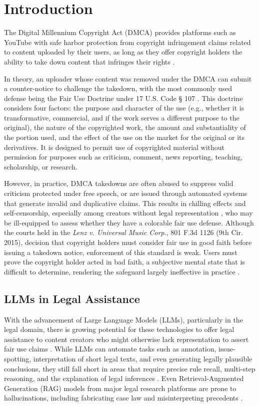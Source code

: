 \section{Introduction}

The Digital Millennium Copyright Act (DMCA) provides platforms such as YouTube with safe harbor protection from copyright infringement claims related to content uploaded by their users, as long as they offer copyright holders the ability to take down content that infringes their rights \cite{16_DMCA}.

In theory, an uploader whose content was removed under the DMCA can submit a counter-notice to challenge the takedown, with the most commonly used defense being the Fair Use Doctrine under 17 U.S. Code § 107 \cite{15_USC107}. This doctrine considers four factors: the purpose and character of the use (e.g., whether it is transformative, commercial, and if the work serves a different purpose to the original), the nature of the copyrighted work, the amount and substantiality of the portion used, and the effect of the use on the market for the original or its derivatives. It is designed to permit use of copyrighted material without permission for purposes such as criticism, comment, news reporting, teaching, scholarship, or research.

However, in practice, DMCA takedowns are often abused to suppress valid criticism protected under free speech, or are issued through automated systems that generate invalid and duplicative claims. This results in chilling effects and self-censorship, especially among creators without legal representation , who may be ill-equipped to assess whether they have a colorable fair use defense. Although the courts held in the \textit{Lenz v. Universal Music Corp.}, 801 F.3d 1126 (9th Cir. 2015), decision that copyright holders must consider fair use in good faith before issuing a takedown notice, enforcement of this standard is weak. Users must prove the copyright holder acted in bad faith, a subjective mental state that is difficult to determine, rendering the safeguard largely ineffective in practice \cite{21a_DMCAAbuse, 21b_DMCAAbuse}.

\subsection{LLMs in Legal Assistance}

With the advancement of Large Language Models (LLMs), particularly in the legal domain, there is growing potential for these technologies to offer legal assistance to content creators who might otherwise lack representation to assert fair use claims \cite{10_LLMFewShotLearner, 20_LLMSurvey, 05_BuildingJusticeBot}. While LLMs can automate tasks such as annotation, issue-spotting, interpretation of short legal texts, and even generating legally plausible conclusions, they still fall short in areas that require precise rule recall, multi-step reasoning, and the explanation of legal inferences \cite{06_GPTAnnotateTextualData, 22_LegalBench}. Even Retrieval-Augmented Generation (RAG) models from major legal research platforms are prone to hallucinations, including fabricating case law and misinterpreting precedents \cite{04_LegalHallucination, 04b_HallucinationFree}.

